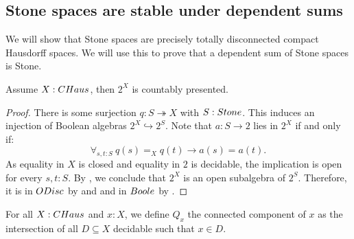 \subsection{Stone spaces are stable under dependent sums}
We will show that Stone spaces are precisely totally disconnected compact Hausdorff spaces. 
We will use this to prove that a dependent sum of Stone spaces is Stone.

\begin{lemma}\label{AlgebraCompactHausdorffCountablyPresented}
Assume $X:\Chaus$, then $2^X$ is countably presented.
\end{lemma}

\begin{proof}
  There is some surjection $q:S\twoheadrightarrow X$ with $S:\Stone$. 
%
  This induces an injection of Boolean algebras $2^X \hookrightarrow 2^S$.
  Note that $a:S\to 2$ lies in $2^X$ if and only if: %
  \[\forall_{s,t:S}\ q(s) =_X q(t) \to a(s)=a(t).\]
  As equality in $X$ is closed and equality in $2$ is decidable, the implication is open for every $s,t:S$. 
  By , we conclude that
  $2^X$ is an open subalgebra of $2^S$. 
  Therefore, it is in $\ODisc$ by
   and  
  and in $\Boole$ by .
%
%
%
\end{proof}
\begin{definition}
For all $X:\Chaus$ and $x:X$,
  we define $Q_x$ the connected component of $x$
  as the intersection of all $D\subseteq X$ decidable such that $x\in D$. 
\end{definition}

